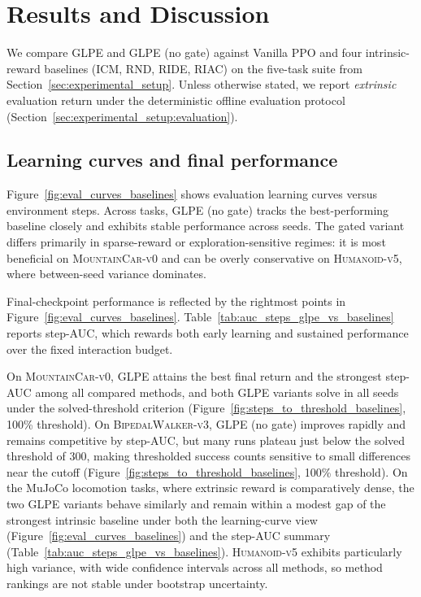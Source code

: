 \section{Results and Discussion}
\label{sec:results}

We compare GLPE and GLPE (no gate) against Vanilla PPO and four intrinsic-reward baselines (ICM, RND, RIDE, RIAC) on the five-task suite from Section~\ref{sec:experimental_setup}.
Unless otherwise stated, we report \emph{extrinsic} evaluation return under the deterministic offline evaluation protocol (Section~\ref{sec:experimental_setup:evaluation}).

\subsection{Learning curves and final performance}

Figure~\ref{fig:eval_curves_baselines} shows evaluation learning curves versus environment steps.
Across tasks, GLPE (no gate) tracks the best-performing baseline closely and exhibits stable performance across seeds.
The gated variant differs primarily in sparse-reward or exploration-sensitive regimes: it is most beneficial on \textsc{MountainCar-v0} and can be overly conservative on \textsc{Humanoid-v5}, where between-seed variance dominates.



Final-checkpoint performance is reflected by the rightmost points in Figure~\ref{fig:eval_curves_baselines}.
Table~\ref{tab:auc_steps_glpe_vs_baselines} reports step-AUC, which rewards both early learning and sustained performance over the fixed interaction budget.



On \textsc{MountainCar-v0}, GLPE attains the best final return and the strongest step-AUC among all compared methods, and both GLPE variants solve in all seeds under the solved-threshold criterion (Figure~\ref{fig:steps_to_threshold_baselines}, 100\% threshold).
On \textsc{BipedalWalker-v3}, GLPE (no gate) improves rapidly and remains competitive by step-AUC, but many runs plateau just below the solved threshold of $300$, making thresholded success counts sensitive to small differences near the cutoff (Figure~\ref{fig:steps_to_threshold_baselines}, 100\% threshold).
On the MuJoCo locomotion tasks, where extrinsic reward is comparatively dense, the two GLPE variants behave similarly and remain within a modest gap of the strongest intrinsic baseline under both the learning-curve view (Figure~\ref{fig:eval_curves_baselines}) and the step-AUC summary (Table~\ref{tab:auc_steps_glpe_vs_baselines}).
\textsc{Humanoid-v5} exhibits particularly high variance, with wide confidence intervals across all methods, so method rankings are not stable under bootstrap uncertainty.

